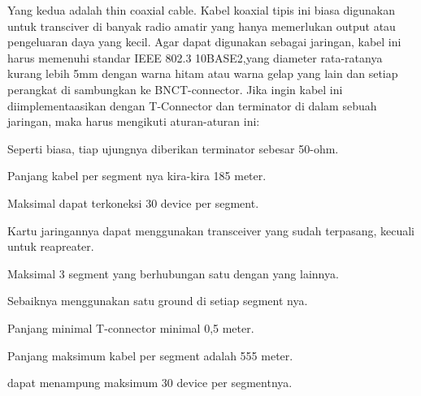 		\hspace{0cm}Yang kedua adalah thin coaxial cable. Kabel koaxial tipis ini biasa digunakan untuk transciver di banyak radio amatir yang hanya memerlukan output atau pengeluaran daya yang kecil. Agar dapat digunakan sebagai jaringan, kabel ini harus memenuhi standar IEEE 802.3 10BASE2,yang diameter rata-ratanya kurang lebih 5mm dengan warna hitam atau warna gelap yang lain dan setiap perangkat di sambungkan ke BNCT-connector. Jika ingin kabel ini diimplementaasikan dengan T-Connector dan terminator di dalam sebuah jaringan, maka harus mengikuti aturan-aturan ini: 
		\begin{itemsize}
			\item Seperti biasa, tiap ujungnya diberikan terminator sebesar 50-ohm.
			\item Panjang kabel per segment nya kira-kira 185 meter.
			\item Maksimal dapat terkoneksi 30 device per segment.
			\item Kartu jaringannya dapat menggunakan transceiver yang sudah terpasang, kecuali untuk reapreater.
			\item Maksimal 3 segment yang berhubungan satu dengan yang lainnya.
			\item Sebaiknya menggunakan satu ground di setiap segment nya.
			\item Panjang minimal T-connector minimal 0,5 meter.
			\item Panjang maksimum kabel per segment adalah 555 meter.
			\item dapat menampung maksimum 30 device per segmentnya.
		\end{itemsize}
		